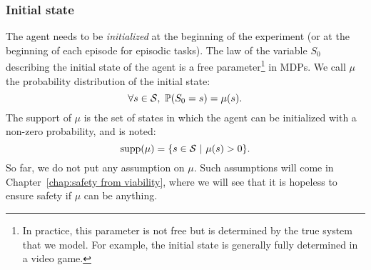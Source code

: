 		\subsubsection{Initial state} 
			The agent needs to be\emph{ initialized} at the beginning of the experiment (or at the beginning of each episode for episodic tasks). The law of the variable $S_0$ describing the initial state of the agent is a free parameter\footnote{In practice, this parameter is not free but is determined by the true system that we model. For example, the initial state is generally fully determined in a video game.} in MDPs. We call $\mu$ the probability distribution of the initial state:
			\begin{equation*}
				\forall s\in\S,~\P(S_0 = s) = \mu(s).
			\end{equation*}
			The support of $\mu$ is the set of states in which the agent can be initialized with a non-zero probability, and is noted:
			\begin{equation*}
				\support(\mu) = \{s\in\S~|~\mu(s) > 0\}.
			\end{equation*}
			So far, we do not put any assumption on $\mu$. Such assumptions will come in Chapter~\ref{chap:safety from viability}, where we will see that it is hopeless to ensure safety if $\mu$ can be anything.

